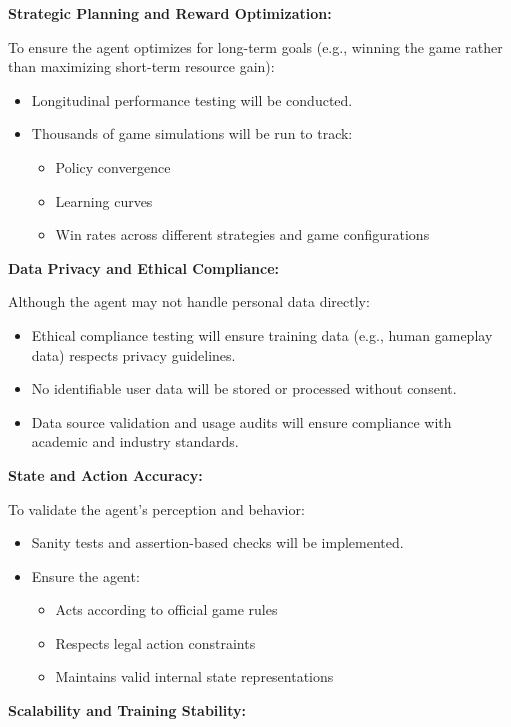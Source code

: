 \documentclass{article}
\begin{document}
\noindent\textbf{Strategic Planning and Reward Optimization:}

To ensure the \RL{} agent optimizes for long-term goals (e.g., winning the game rather than maximizing short-term resource gain):
\begin{itemize}
    \item Longitudinal performance testing will be conducted.
    \item Thousands of game simulations will be run to track:
    \begin{itemize}
        \item Policy convergence
        \item Learning curves
        \item Win rates across different strategies and game configurations
    \end{itemize}
\end{itemize}

\noindent\textbf{Data Privacy and Ethical Compliance:}

Although the \RL{} agent may not handle personal data directly:
\begin{itemize}
    \item Ethical compliance testing will ensure training data (e.g., human gameplay data) respects privacy guidelines.
    \item No identifiable user data will be stored or processed without consent.
    \item Data source validation and usage audits will ensure compliance with academic and industry standards.
\end{itemize}

\noindent\textbf{State and Action Accuracy:}

To validate the agent’s perception and behavior:
\begin{itemize}
    \item Sanity tests and assertion-based checks will be implemented.
    \item Ensure the agent:
    \begin{itemize}
        \item Acts according to official game rules
        \item Respects legal action constraints
        \item Maintains valid internal state representations
    \end{itemize}
\end{itemize}

\noindent\textbf{Scalability and Training Stability:}
\end{document}
